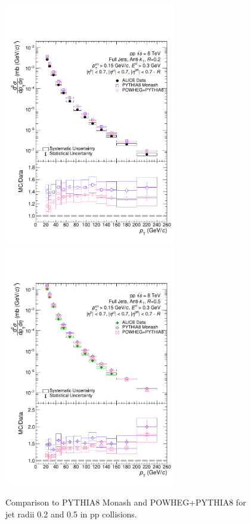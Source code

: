 \documentclass[ALICE]{ALICE_analysis_notes}
\newcommand{\pp}{pp\xspace}
\begin{document}
\begin{figure}
    \centering
    \begin{multicols}{2}
            \includegraphics[width=7.5cm]{figures/MCGen/MCComp_R02_nooutlier.pdf}
        \vfill\null
        \columnbreak
            \includegraphics[width=7.5cm]{figures/MCGen/MCComp_R05_nooutlier.pdf}
        \vfill\null
    \end{multicols}
    \caption{Comparison to PYTHIA8 Monash and POWHEG+PYTHIA8 for jet radii 0.2 and 0.5 in \pp collisions.}
    \label{fig:MCGen}
\end{figure}
\end{document}
